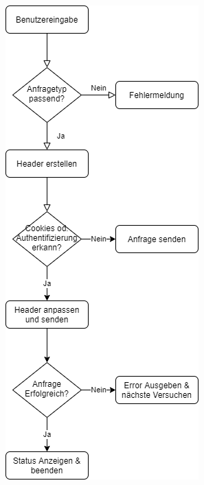\documentclass{article}
\begin{document}
\begin{center}
 \includegraphics[scale=0.6]{ablauf.png}   
\end{center}
\end{document}
